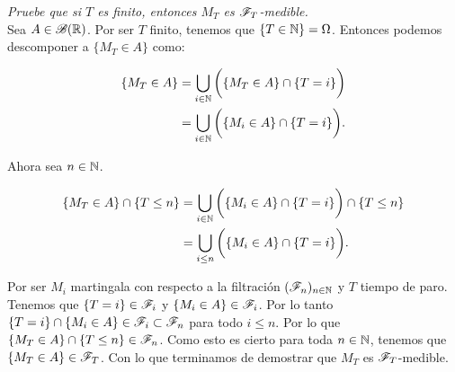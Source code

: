 \emph{
	Pruebe que si $T$ es finito, entonces $M_T$ es $\mathscr{F}_T$-medible.\\
}
\afterstatement
	Sea $A \in \mathscr{B}(\mathbb{R})$. Por ser $T$ finito, tenemos que $\{ T \in \mathbb{N} \} = \Omega$. Entonces
	podemos descomponer a $\{ M_T \in A \}$ como:
	
	\begin{align}
		\{ M_T \in A \}		&=		\bigcup_{i \in \mathbb{N}} \bigg( \{ M_T \in A \} \cap \{ T = i \} \bigg)\\
							&=		\bigcup_{i \in \mathbb{N}} \bigg( \{ M_i \in A \} \cap \{ T = i \} \bigg).
	\end{align}

	Ahora sea $n \in \mathbb{N}$. 
	
	\begin{align}
		\{ M_T \in A \} \cap \{ T \leq n \}		&=		\bigcup_{i \in \mathbb{N}} \bigg( \{ M_i \in A \} \cap \{ T = i \} \bigg) \cap \{ T \leq n \} \\
												&=		\bigcup_{i \leq n} \bigg( \{ M_i \in A \} \cap \{ T = i \} \bigg).
	\end{align}
	
	Por ser $M_i$ martingala con respecto a la filtración $(\mathscr{F}_n)_{n \in \mathbb{N}}$ y $T$ tiempo de paro. Tenemos que $\{ T = i\} \in \mathscr{F}_i$ y
	$\{ M_i \in A \} \in \mathscr{F}_i$. Por lo tanto $\{ T = i\} \cap \{ M_i \in A \} \in \mathscr{F}_i \subset \mathscr{F}_n$ para todo $i \leq n$. Por lo que
	$\{ M_T \in A \} \cap \{ T \leq n \} \in \mathscr{F}_n$. Como esto es cierto para toda $n \in \mathbb{N}$, tenemos que $\{ M_T \in A \} \in \mathscr{F}_T$. Con
	lo que terminamos de demostrar que $M_T$ es $\mathscr{F}_T$-medible.\\
	